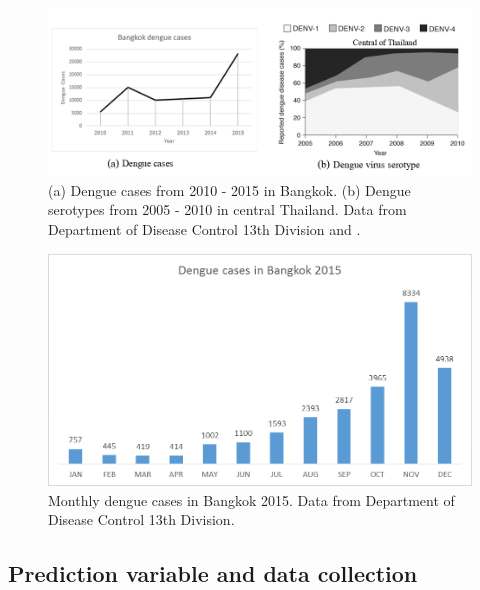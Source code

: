 \documentclass[review]{elsarticle}
\begin{document}
\begin{figure}[htbp]
	\begin{center}
		\includegraphics[width=145mm]{./figures/bangkok_dengue_data}
		\caption{ (a) Dengue cases from 2010 - 2015 in Bangkok. (b) Dengue serotypes from 2005 - 2010 in central Thailand. Data from Department of Disease Control 13th Division and \protect\cite{limkittikul2014epidemiological}. }
		\label{figure-bangkok-data}
	\end{center}
\end{figure}


\begin{figure}[htbp]
	\begin{center}
		\includegraphics[width=120mm]{./figures/dengue_bangkok_2015}
		\caption{ Monthly dengue cases in Bangkok  2015. Data from Department of Disease Control 13th Division. }
		\label{figure-dengue_bangkok_2015}
	\end{center}
\end{figure}














\subsection{Prediction variable and data collection}
\label{section-Prediction-variable}
\end{document}
